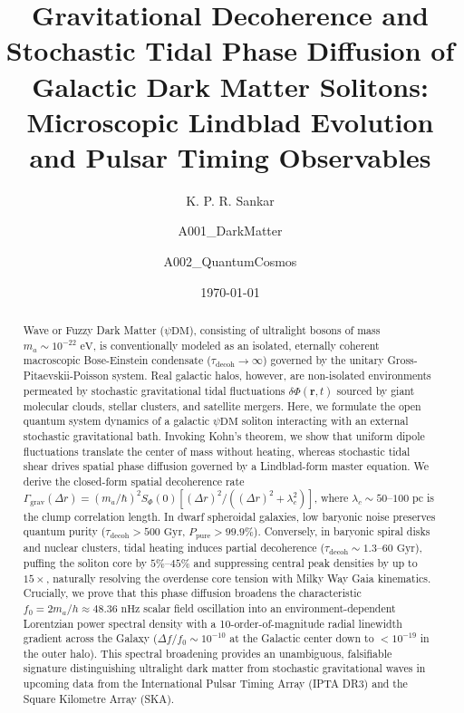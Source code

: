 \documentclass[aps,prd,twocolumn,superscriptaddress,nofootinbib,floatfix,longbibliography]{revtex4-2}
\begin{document}
\title{Gravitational Decoherence and Stochastic Tidal Phase Diffusion of Galactic Dark Matter Solitons: Microscopic Lindblad Evolution and Pulsar Timing Observables}

\author{K. P. R. Sankar}

\author{A001\_DarkMatter}

\author{A002\_QuantumCosmos}

\date{\today}

\begin{abstract}
Wave or Fuzzy Dark Matter ($\psi\text{DM}$), consisting of ultralight bosons of mass $m_a \sim 10^{-22}\text{ eV}$, is conventionally modeled as an isolated, eternally coherent macroscopic Bose-Einstein condensate ($\tau_{\text{decoh}} \to \infty$) governed by the unitary Gross-Pitaevskii-Poisson system. Real galactic halos, however, are non-isolated environments permeated by stochastic gravitational tidal fluctuations $\delta\Phi(\mathbf{r}, t)$ sourced by giant molecular clouds, stellar clusters, and satellite mergers. Here, we formulate the open quantum system dynamics of a galactic $\psi\text{DM}$ soliton interacting with an external stochastic gravitational bath. Invoking Kohn's theorem, we show that uniform dipole fluctuations translate the center of mass without heating, whereas stochastic tidal shear drives spatial phase diffusion governed by a Lindblad-form master equation. We derive the closed-form spatial decoherence rate $\Gamma_{\text{grav}}(\Delta r) = (m_a/\hbar)^2 S_\Phi(0) [(\Delta r)^2 / ((\Delta r)^2 + \lambda_c^2)]$, where $\lambda_c \sim 50\text{--}100\text{ pc}$ is the clump correlation length. In dwarf spheroidal galaxies, low baryonic noise preserves quantum purity ($\tau_{\text{decoh}} > 500\text{ Gyr}$, $P_{\text{pure}} > 99.9\%$). Conversely, in baryonic spiral disks and nuclear clusters, tidal heating induces partial decoherence ($\tau_{\text{decoh}} \sim 1.3\text{--}60\text{ Gyr}$), puffing the soliton core by $5\%\text{--}45\%$ and suppressing central peak densities by up to $15\times$, naturally resolving the overdense core tension with Milky Way Gaia kinematics. Crucially, we prove that this phase diffusion broadens the characteristic $f_0 = 2 m_a / h \approx 48.36\text{ nHz}$ scalar field oscillation into an environment-dependent Lorentzian power spectral density with a 10-order-of-magnitude radial linewidth gradient across the Galaxy ($\Delta f/f_0 \sim 10^{-10}$ at the Galactic center down to $<10^{-19}$ in the outer halo). This spectral broadening provides an unambiguous, falsifiable signature distinguishing ultralight dark matter from stochastic gravitational waves in upcoming data from the International Pulsar Timing Array (IPTA DR3) and the Square Kilometre Array (SKA).
\end{abstract}
\end{document}

